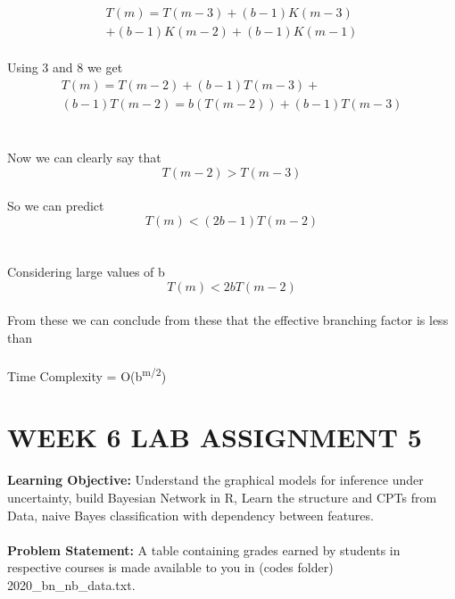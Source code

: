 \documentclass[conference]{IEEEtran}
\begin{document}
\\
\begin{equation}
\begin{split}
T(m) = T(m − 3) + (b − 1)K(m − 3)
\\+ (b − 1)K(m − 2)+ (b-1)K(m-1) \label{eq}
\end{split}
\end{equation}
\\
Using 3 and 8 we get
\\
\begin{equation}
\begin{split}
T(m) = T(m − 2) + (b − 1)T(m − 3) +
\\(b − 1)T(m − 2)= b(T(m-2)) + (b-1)T(m-3) \label{eq}
\end{split}
\end{equation}
\\
\\
Now we can clearly say that
\begin{equation}
T(m − 2) > T(m − 3) \label{eq}
\end{equation}
\\
So we can predict
\\
\begin{equation}
T(m) < (2b − 1)T(m − 2) \label{eq}
\end{equation}
\\
\\
Considering large values of b
\begin{equation}
T(m) < 2bT(m − 2) \label{eq}
\end{equation}
\\
From these we can conclude from these that the effective branching factor is less than 
\\
\\
Time Complexity  = O(b\textsuperscript{m/2})

\section{WEEK 6 LAB ASSIGNMENT 5}
\textbf{Learning Objective:}
Understand the graphical models for inference under uncertainty, build Bayesian Network in R, Learn the structure and CPTs from Data, naive Bayes classification with dependency between features.
\\
\\
\textbf{Problem Statement:}
A table containing grades earned by students in respective courses is made available to you in (codes folder) 2020\_bn\_nb\_data.txt.
\end{document}
